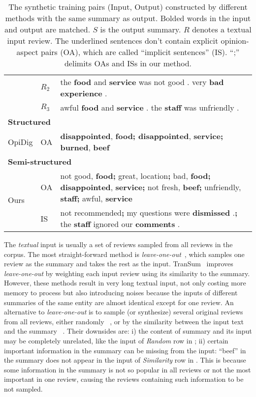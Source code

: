 {\begin{table}[th]
{\begin{tabular}{|m{0.9cm}|m{0.3cm}<{\centering}|m{5.8cm}|}
		\cline{2-3}
		& $R_2$& the \textbf{food} and \textbf{service} was not good . very \textbf{bad experience} .
		\\
		\cline{2-3}
		& $R_3$ &awful \textbf{food} and \textbf{service} . the \textbf{staff} was unfriendly .
		\\
		\hline
		\multicolumn{3}{|l|}{\bf Structured} \\
		\hline
		OpiDig & OA & \textbf{disappointed}, \textbf{food; disappointed}, \textbf{service; burned}, \textbf{beef}
		\\
		\hline
		\multicolumn{3}{|l|}{\bf Semi-structured} \\
		\hline
		\multirow{2}{0.1cm}{Ours} & OA &not good, \textbf{food;} great, location\textbf{;} bad, \textbf{food; disappointed}, \textbf{service;} not fresh, \textbf{beef;} unfriendly, \textbf{staff;} awful, \textbf{service}\\
		\cline{2-3}
		& IS &not recommended\textbf{;} my questions were \textbf{dismissed} .\textbf{;} the \textbf{staff} ignored our \textbf{comments} .\\
		\hline
	\end{tabular}
}
	\caption{The synthetic training pairs (Input, Output) constructed by different methods with the same summary as output. 
		Bolded words in the input and output are matched.
	   $S$ is the output summary. 
	   $R$ denotes a textual input review. 
		The underlined sentences don't contain explicit opinion-aspect pairs (OA), 
		which are called ``implicit sentences'' (IS).  
		``;'' delimits OAs and ISs in our method.
		}\label{tab:previous_data}  
\end{table}
}%

The {\em textual} input is usually a set of reviews sampled 
from all reviews in the corpus. 
The most straight-forward method is {\em leave-one-out}~\cite{Copycat20}, 
which samples one review as the summary and takes the rest as the input. 
TranSum~\cite{transsum21} improves {\em leave-one-out} by weighting 
each input review using its similarity to the summary.
However, these methods result in very long textual input, not only costing more memory to process but also introducing noises 
because the inputs of different summaries of the same entity are almost identical except for one review.
An alternative to {\em leave-one-out} is to sample (or synthesize) several 
original reviews from all reviews, 
either randomly 
~\cite{Fewshot20}, or by the similarity between the input text and the summary 
~\cite{Denoise20,Plansum20}.
Their downsides are: i) the content of summary and its input may be completely unrelated, 
like the input of {\em Random} row in ; 
ii) certain important information in the summary can be missing from the input: ``beef'' in the summary 
does not appear in the input of {\em Similarity} row in .
This is because some information in the summary is not so popular in all reviews or
not the most important in one review,
causing the reviews containing such information to be not sampled.


